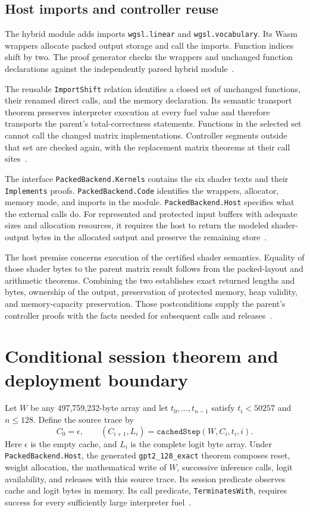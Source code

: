 \documentclass[11pt]{article}
\newcommand{\code}[1]{\texttt{#1}}
\begin{document}
\subsection{Host imports and controller reuse}

The hybrid module adds imports \code{wgsl.linear} and \code{wgsl.vocabulary}.  Its Wasm wrappers allocate packed output storage and call the imports.  Function indices shift by two.  The proof generator checks the wrappers and unchanged function declarations against the independently parsed hybrid module~\cite{build,backend}.

The reusable \code{ImportShift} relation identifies a closed set of unchanged functions, their renamed direct calls, and the memory declaration.  Its semantic transport theorem preserves interpreter execution at every fuel value and therefore transports the parent's total-correctness statements.  Functions in the selected set cannot call the changed matrix implementations.  Controller segments outside that set are checked again, with the replacement matrix theorems at their call sites~\cite{transport,composition}.

The interface \code{PackedBackend.Kernels} contains the six shader texts and their \code{Implements} proofs.  \code{PackedBackend.Code} identifies the wrappers, allocator, memory mode, and imports in the module.  \code{PackedBackend.Host} specifies what the external calls do.  For represented and protected input buffers with adequate sizes and allocation resources, it requires the host to return the modeled shader-output bytes in the allocated output and preserve the remaining store~\cite{backend}.

The host premise concerns execution of the certified shader semantics.  Equality of those shader bytes to the parent matrix result follows from the packed-layout and arithmetic theorems.  Combining the two establishes exact returned lengths and bytes, ownership of the output, preservation of protected memory, heap validity, and memory-capacity preservation.  Those postconditions supply the parent's controller proofs with the facts needed for subsequent calls and releases~\cite{packedshader,backend}.

\section{Conditional session theorem and deployment boundary}

Let $W$ be any 497,759,232-byte array and let $t_0,\ldots,t_{n-1}$ satisfy $t_i<50257$ and $n\leq128$.  Define the source trace by
\[
C_0=\epsilon,\qquad (C_{i+1},L_i)=\code{cachedStep}(W,C_i,t_i,i).
\]
Here $\epsilon$ is the empty cache, and $L_i$ is the complete logit byte array.  Under \code{PackedBackend.Host}, the generated \code{gpt2\_128\_exact} theorem composes reset, weight allocation, the mathematical write of $W$, successive inference calls, logit availability, and releases with this source trace.  Its session predicate observes cache and logit bytes in memory.  Its call predicate, \code{TerminatesWith}, requires success for every sufficiently large interpreter fuel~\cite{composition,session}.
\end{document}
